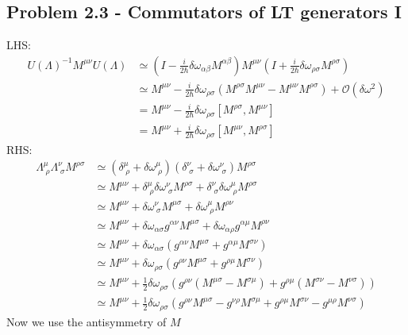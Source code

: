 \documentclass[../main.tex]{subfiles}
\begin{document}
\subsection{Problem 2.3 - Commutators of LT generators I}
LHS:
\begin{align}
U(\Lambda)^{-1}M^{\mu\nu}U(\Lambda)
&\simeq\left(I-\frac{i}{2\hbar}\delta\omega_{\alpha\beta}M^{\alpha\beta}\right)M^{\mu\nu}\left(I+\frac{i}{2\hbar}\delta\omega_{\rho\sigma}M^{\rho\sigma}\right)\\
&\simeq M^{\mu\nu}-\frac{i}{2\hbar}\delta\omega_{\rho\sigma}(M^{\rho\sigma}M^{\mu\nu}-M^{\mu\nu}M^{\rho\sigma})+\mathcal{O}(\delta\omega^2)\\
&= M^{\mu\nu}-\frac{i}{2\hbar}\delta\omega_{\rho\sigma}[M^{\rho\sigma},M^{\mu\nu}]\\
&= M^{\mu\nu}+\frac{i}{2\hbar}\delta\omega_{\rho\sigma}[M^{\mu\nu},M^{\rho\sigma}]
\end{align}
RHS:
\begin{align}
\Lambda^{\mu}_{\;\rho}\Lambda^\nu_{\;\sigma}M^{\rho\sigma}
&\simeq\left(\delta^{\mu}_{\;\rho}+\delta\omega^{\mu}_{\;\rho}\right)\left(\delta^{\nu}_{\;\sigma}+\delta\omega^{\nu}_{\;\sigma}\right)M^{\rho\sigma}\\
&\simeq M^{\mu\nu}+\delta^\mu_{\;\rho}\delta\omega^\nu_{\;\sigma}M^{\rho\sigma}+\delta^\nu_{\;\sigma}\delta\omega^\mu_{\;\rho}M^{\rho\sigma}\\
&\simeq M^{\mu\nu}+\delta\omega^\nu_{\;\sigma}M^{\mu\sigma}+\delta\omega^\mu_{\;\rho}M^{\rho\nu}\\
&\simeq M^{\mu\nu}+\delta\omega_{\alpha\sigma}g^{\alpha\nu}M^{\mu\sigma}+\delta\omega_{\alpha\rho}g^{\alpha\mu}M^{\rho\nu}\\
&\simeq M^{\mu\nu}+\delta\omega_{\alpha\sigma}(g^{\alpha\nu}M^{\mu\sigma}+g^{\alpha\mu}M^{\sigma\nu})\\
&\simeq M^{\mu\nu}+\delta\omega_{\rho\sigma}(g^{\rho\nu}M^{\mu\sigma}+g^{\rho\mu}M^{\sigma\nu})\\
&\simeq M^{\mu\nu}+\frac{1}{2}\delta\omega_{\rho\sigma}\left(g^{\rho\nu}(M^{\mu\sigma}-M^{\sigma\mu})+g^{\rho\mu}(M^{\sigma\nu}-M^{\nu\sigma})\right)\\
&\simeq M^{\mu\nu}+\frac{1}{2}\delta\omega_{\rho\sigma}\left(g^{\rho\nu}M^{\mu\sigma}-g^{\nu\rho}M^{\sigma\mu}+g^{\rho\mu}M^{\sigma\nu}-g^{\mu\rho}M^{\nu\sigma}\right)
\end{align}
Now we use the antisymmetry of $M$ 
\end{document}
